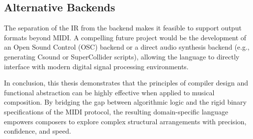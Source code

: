 \subsection{Alternative Backends}\label{detail-subsec:alternative-backends}
The separation of the IR from the backend makes it feasible to support output formats beyond MIDI\@.
A compelling future project would be the development of an Open Sound Control (OSC) backend or a direct audio synthesis
backend (e.g., generating Csound or SuperCollider scripts), allowing the language to directly interface with modern
digital signal processing environments.

\vspace{1cm}
In conclusion, this thesis demonstrates that the principles of compiler design and functional abstraction can be highly
effective when applied to musical composition.
By bridging the gap between algorithmic logic and the rigid binary specifications of the MIDI protocol, the resulting
domain-specific language empowers composers to explore complex structural arrangements with precision,
confidence, and speed.

